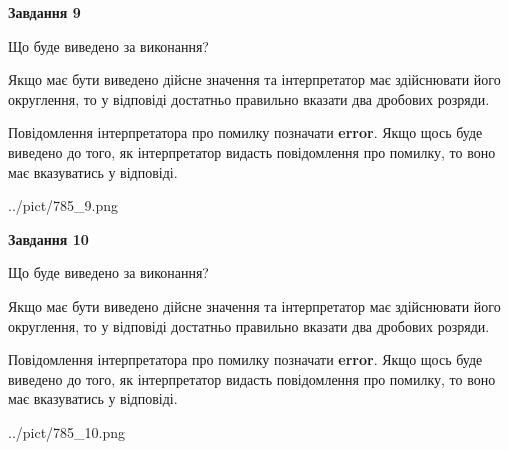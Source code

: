 \documentclass[12pt, ukrainian]{article}
\begin{document}
{\begin {Large}
{\begin {center}\textbf{Завдання 9}\end {center}}\par
Що буде виведено за виконання? \par

Якщо має бути виведено дійсне значення та інтерпретатор має здійснювати його округлення, 
то у відповіді достатньо правильно вказати два дробових розряди.

Повідомлення інтерпретатора про помилку позначати \textbf{error}.
Якщо щось буде виведено до того, як інтерпретатор видасть повідомлення про помилку, 
то воно має вказуватись у відповіді. \par

\begin{center}
	{../pict/785_9.png}
\end{center}
\newpage

{\begin {center}\textbf{Завдання 10}\end {center}}\par
Що буде виведено за виконання? \par

Якщо має бути виведено дійсне значення та інтерпретатор має здійснювати його округлення, 
то у відповіді достатньо правильно вказати два дробових розряди.

Повідомлення інтерпретатора про помилку позначати \textbf{error}.
Якщо щось буде виведено до того, як інтерпретатор видасть повідомлення про помилку, 
то воно має вказуватись у відповіді. \par

\begin{center}
	{../pict/785_10.png}
\end{center}
\newpage

\end {Large}}
\end{document}
